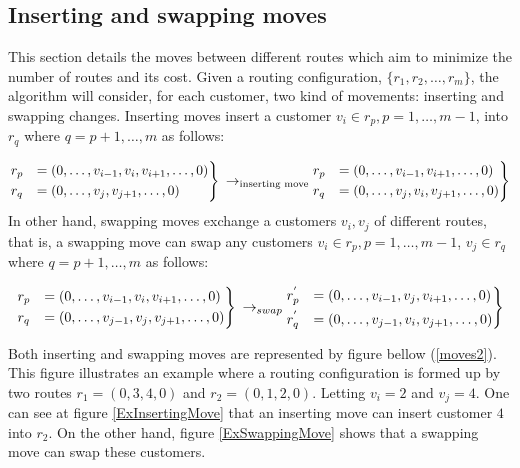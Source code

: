 \subsection{Inserting and swapping moves}\label{MovesDifferentRoutes}

This section details the moves between different routes which aim to minimize the number of routes and its cost. Given a routing configuration, $\{r_{1},r_{2},\dots,r_{m}\}$, the algorithm will consider, for each customer, two kind of movements: inserting and swapping changes. 
Inserting moves insert a customer $v_{i} \in r_{p}, p = 1,\dots,m-1$, into $r_{q}$ where $q=p+1,\dots,m$ as follows:

\begin{equation*}
\begin{rcases}
r_{p} &= (0,\dots,v_{i-1},v_{i},v_{i+1},\dots,0) \\
r_{q} &= (0,\dots,v_{j},v_{j+1},\dots,0)
\end{rcases}
\text{ $\rightarrow_{\text{inserting move}}$}	\begin{rcases}
r_{p} &= (0,\dots,v_{i-1},v_{i+1},\dots,0)\\
r_{q} &= (0,\dots,v_{j},v_{i},v_{j+1},\dots,0)
\end{rcases}
\end{equation*}
In other hand, swapping moves exchange a customers $v_i, v_j$ of different routes, that is, a swapping move can swap any customers $v_{i} \in r_{p}, p = 1,\dots,m-1$, $v_{j} \in r_{q}$ where $q= p + 1, \dots , m$  as follows:


\begin{equation*}
\begin{rcases}
r_{p} &= (0,\dots,v_{i-1},v_{i},v_{i+1},\dots,0)  \\
r_{q} &= (0,\dots,v_{j-1},v_{j},v_{j+1},\dots,0)
\end{rcases}
\text{ $\rightarrow_{swap}$}	\begin{rcases}
r_{p}^{'} &= (0,\dots,v_{i-1},v_{j},v_{i+1},\dots,0)  \\
r_{q}^{'} &= (0,\dots,v_{j-1},v_{i},v_{j+1},\dots,0)
\end{rcases}
\end{equation*}

Both inserting and swapping moves are represented by figure bellow (\ref{moves2}). This figure illustrates an example where a routing configuration is formed up by two routes $r_{1} = (0,3,4,0)$ and $r_{2} = (0,1,2,0)$. Letting $v_i = 2$ and $v_j = 4$. One can see at figure \ref{ExInsertingMove} that an inserting move can insert customer $4$ into $r_2$. On the other hand, figure \ref{ExSwappingMove} shows that a swapping move can swap these customers.

